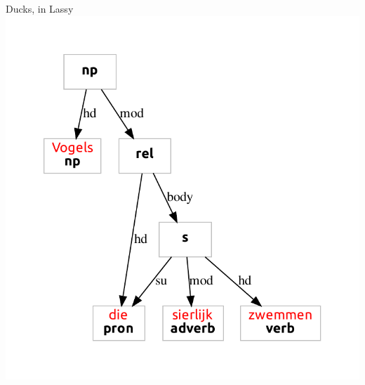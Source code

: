 \documentclass{beamer}
\begin{document}
{
\begin{frame}{Ducks, in Lassy}
\includegraphics[width=\textwidth,height=\textheight,keepaspectratio]{quackers.pdf}\end{frame}
}
\end{document}
